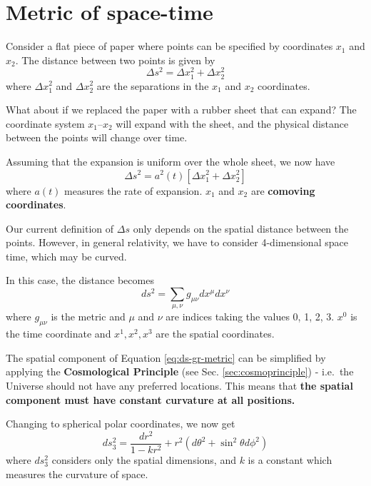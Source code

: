 \documentclass[11pt,a4paper]{book}
\begin{document}
\hypertarget{sec:metric}{%
\section{Metric of space-time}\label{sec:metric}}

Consider a flat piece of paper where points can be specified by
coordinates \(x_1\) and \(x_2\). The distance between two points is given by
\begin{equation}
\Delta s^2 = \Delta x_{1}^{2} + \Delta x_{2}^{2}
\label{eq:dist01}
\end{equation}
where
\(\Delta x_{1}^{2}\) and \(\Delta x_{2}^{2}\) are the separations in the
\(x_1\) and \(x_2\) coordinates.

What about if we replaced the paper with a rubber sheet that can expand?
The coordinate system \(x_1\)--\(x_2\) will expand with the sheet, and the
physical distance between the points will change over time.

Assuming that the expansion is uniform over the whole sheet, we now have
\begin{equation}
\Delta s^2 = a^2(t)\left[\Delta x_{1}^{2} + \Delta x_{2}^{2}\right]
\label{eq:comoving01}
\end{equation}
where \(a(t)\) measures the rate of expansion. \(x_1\) and \(x_2\) are
\textbf{comoving coordinates}.

Our current definition of \(\Delta s\) only depends on the spatial
distance between the points. However, in general relativity, we have to
consider 4-dimensional space time, which may be curved.

In this case, the distance becomes
\begin{equation}
ds^2 = \sum_{\mu, \nu} g_{\mu\nu} dx^{\mu} dx^{\nu}
\label{eq:ds-gr-metric}
\end{equation}
where \(g_{\mu\nu}\) is the metric and \(\mu\) and \(\nu\) are indices taking
the values 0, 1, 2, 3. \(x^{0}\) is the time coordinate and
\(x^{1}, x^{2}, x^{3}\) are the spatial coordinates.

The spatial component of
Equation \eqref{eq:ds-gr-metric} can be simplified by applying the
\textbf{Cosmological Principle} (see Sec. \ref{sec:cosmoprinciple}) - i.e.~the Universe should not have any
preferred locations. This means that \textbf{the spatial component must have
constant curvature at all positions.}

Changing to spherical polar coordinates, we now get
\begin{equation}
ds^2_3 = \dfrac{dr^2}{1 - kr^2} + r^2\left(d\theta^2 + \sin^2\theta d\phi^2\right)
\label{eq:ds-gr-metric-polar}
\end{equation}
where \(ds_3^2\) considers only the spatial dimensions, and \(k\) is a
constant which measures the curvature of space.
\end{document}
